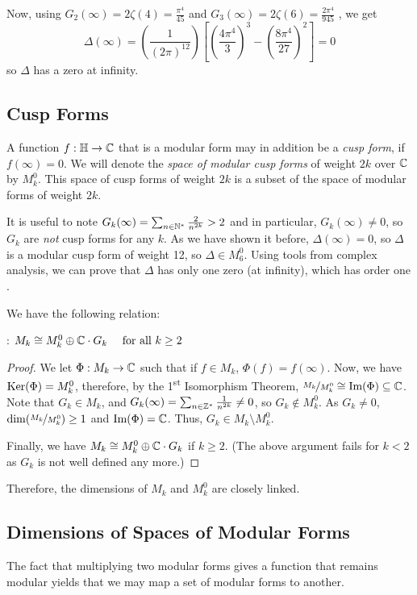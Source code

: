 Now, using 
$
G_2(\infty) = 2\zeta(4) = \frac{\pi^4}{45}
$
 and 
$
G_3(\infty) = 2\zeta(6) = \frac{2\pi^4}{945}
$
, we get 
$$
\Delta(\infty) = \left( \frac{1}{(2\pi)^{12}} \right) \left[ \left( \frac{4\pi^4}{3} \right)^3 - \left( \frac{8\pi^4}{27} \right)^2 \right] =  0
$$
so $\Delta$ has a zero at infinity.


\subsection{Cusp Forms}
A function $f:\mathbb{H} \to \mathbb{C}$ that is a modular form may in addition be a \textit{cusp form}, if $f(\infty)=0$.
We will denote the \textit{space of modular cusp forms} of weight $2k$ over $\mathbb{C}$ by $M_k^0$. This space of cusp forms of weight $2k$ is a subset of the space of modular forms of weight $2k$.

It is useful to note $G_k(\infty) = \sum_{n \in \mathbb{N}^*} \frac{2}{n^{2k}} > 2$ and in particular, $G_k(\infty) \neq 0$, so $G_k$ are \textit{not} cusp forms for any $k$.
As we have shown it before, $\Delta(\infty)=0$, so $\Delta$ is a modular cusp form of weight 12, so $\Delta \in M_6^0$.
Using tools from complex analysis, we can prove that $\Delta$ has only one zero (at infinity), which has order one \cite[p.88]{CourseInArithmetic}.

We have the following relation:
\begin{theorem}
	\cite[p.88]{CourseInArithmetic}:
    $M_k \cong M_k^0 \oplus \mathbb{C} \cdot G_k \quad \text{ for all } k \geq 2$
\end{theorem}
\begin{proof}
    We let $\Phi:M_k \to \mathbb{C}$ such that if $f \in M_k$, $\Phi(f) = f(\infty)$.
    Now, we have $\text{Ker}(\Phi) = M_k^0$, therefore, by the 1\textsuperscript{st} Isomorphism Theorem, $\nicefrac{M_k}{M_k^0} \cong \text{Im}(\Phi) \subseteq \mathbb{C}$.
    Note that $G_k \in M_k$, and $G_k(\infty) = \sum_{n \in \mathbb{Z}^*} \frac{1}{n^{2k}} \neq 0$, so $G_k \not\in M_k^0$.
    As $G_k \neq 0$, $\dim(\nicefrac{M_k}{M_k^0}) \geq 1$ and $\text{Im}(\Phi) = \mathbb{C}$.
    Thus, $G_k \in M_k \setminus M_k^0$.
    
    Finally, we have $M_k \cong M_k^0 \oplus \mathbb{C} \cdot G_k$ if $k \geq 2$.
    (The above argument fails for $k<2$ as $G_k$ is not well defined any more.)
\end{proof}
Therefore, the dimensions of $M_k$ and $M_k^0$ are closely linked.



\subsection{Dimensions of Spaces of Modular Forms}
The fact that multiplying two modular forms gives a function that remains modular yields that we may map a set of modular forms to another.

